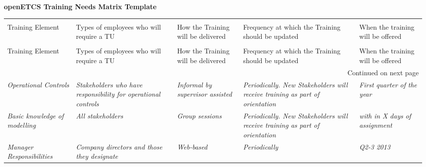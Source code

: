 \documentclass[a4paper, 11pt]{article}
\newcommand{\ra}[1]{\renewcommand{\arraystretch}{#1}}
\begin{document}
\begin{center} \huge\bf openETCS Training Needs Matrix Template\end{center}

\vspace{1\baselineskip}\vspace{-\parskip}

\begin{center}
\begin{longtable}{|m{3.75cm}|m{4cm}|m{6cm}|m{4.5cm}|m{3.25cm}|}
\rowcolor{myblue} \multicolumn{5}{|c|}{Training Needs Matrix Template} \\ \rowcolor{lightgray} 

Training Element & Types of employees who will require a TU & How the Training will be delivered & Frequency at which the Training should be updated & When the training will be offered \\ \hline 
\endfirsthead

\rowcolor{myblue} \multicolumn{5}{|c|}{Training Needs Matrix Template} \\ \rowcolor{lightgray} 

Training Element & Types of employees who will require a TU & How the Training will be delivered & Frequency at which the Training should be updated & When the training will be offered \\ \hline
\endhead

\hline \multicolumn{5}{|r|}{{Continued on next page}} \\ \hline
\endfoot

\hline \hline
\endlastfoot

{\it Operational Controls} &
{\it Stakeholders who have responsibility for operational controls} &
{\it Informal by supervisor assisted} &
{\it Periodically. New Stakeholders will receive training as part of orientation} &
{\it First quarter of the year}
\\\hline
{\it Basic knowledge of modelling} &
{\it All stakeholders} &
{\it Group sessions} &
{\it Periodically. New Stakeholders will receive training as part of orientation} &
{\it with in X days of assignment}
\\\hline
{\it Manager Responsibilities} &
{\it Company directors and those they designate} &
{\it Web-based} &
{\it Periodically} &
{\it Q2-3 2013}
\\\hline
\end{longtable}
\end{center}
\end{document}
